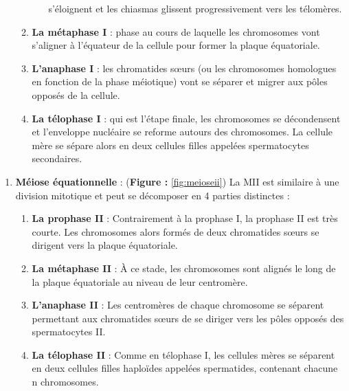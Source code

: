 \documentclass[12pt,twoside]{reedthesis}
\providecommand{\tightlist}{%
  \setlength{\itemsep}{0pt}\setlength{\parskip}{0pt}}
\theoremstyle{definition}
\theoremstyle{definition}
\theoremstyle{remark}
\begin{document}
\begin{enumerate}
\begin{enumerate}
\begin{enumerate}
        s'éloignent et les chiasmas glissent progressivement vers les
        télomères.\\
      \end{enumerate}
    \item
      \textbf{La métaphase I} : phase au cours de laquelle les chromosomes
      vont s'aligner à l'équateur de la cellule pour former la plaque
      équatoriale.
    \item
      \textbf{L'anaphase I} : les chromatides sœurs (ou les chromosomes
      homologues en fonction de la phase méiotique) vont se séparer et
      migrer aux pôles opposés de la cellule.\\
    \item
      \textbf{La télophase I} : qui est l'étape finale, les chromosomes se
      décondensent et l'enveloppe nucléaire se reforme autours des
      chromosomes. La cellule mère se sépare alors en deux cellules filles
      appelées spermatocytes secondaires.
    \end{enumerate}
  \end{enumerate}
  
  \newpage
  
  \begin{enumerate}
  \def\labelenumi{\arabic{enumi}.}
  \setcounter{enumi}{1}
  \tightlist
  \item
    \textbf{Méiose équationnelle} : (\textbf{Figure : }\ref{fig:meioseii})
    La MII est similaire à une division mitotique et peut se décomposer en
    4 parties distinctes :
  
    \begin{enumerate}
    \def\labelenumii{\alph{enumii}.}
    \tightlist
    \item
      \textbf{La prophase II} : Contrairement à la prophase I, la prophase
      II est très courte. Les chromosomes alors formés de deux chromatides
      sœurs se dirigent vers la plaque équatoriale.\\
    \item
      \textbf{La métaphase II} : À ce stade, les chromosomes sont alignés
      le long de la plaque équatoriale au niveau de leur centromère.\\
    \item
      \textbf{L'anaphase II} : Les centromères de chaque chromosome se
      séparent permettant aux chromatides sœurs de se diriger vers les
      pôles opposés des spermatocytes II.\\
    \item
      \textbf{La télophase II} : Comme en télophase I, les cellules mères
      se séparent en deux cellules filles haploïdes appelées spermatides,
      contenant chacune n chromosomes.
    \end{enumerate}
  \end{enumerate}
  
\end{document}
